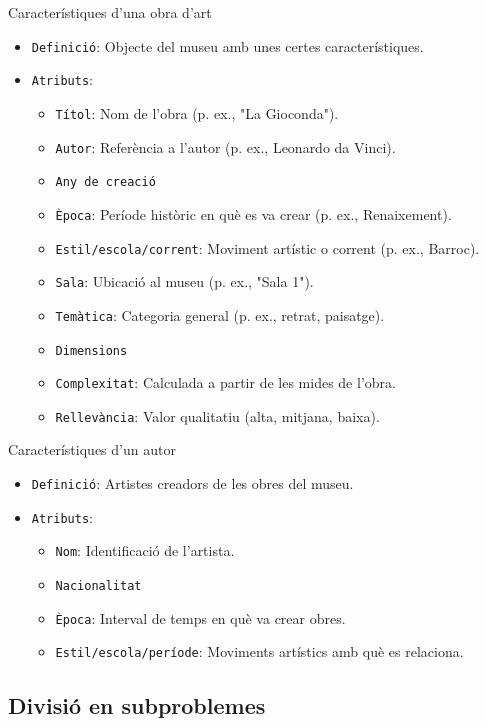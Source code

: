 \documentclass[a4paper]{article}
\begin{document}
	Característiques d'una obra d'art
	\begin{itemize}
		\item \texttt{Definició}: Objecte del museu amb unes certes característiques.
		\item \texttt{Atributs}:
			\begin{itemize}
				\item \texttt{Títol}: Nom de l’obra (p. ex., "La Gioconda").
				\item \texttt{Autor}: Referència a l’autor (p. ex., Leonardo da Vinci).
				\item \texttt{Any de creació}
				\item \texttt{Època}: Període històric en què es va crear (p. ex., Renaixement).
				\item \texttt{Estil/escola/corrent}: Moviment artístic o corrent (p. ex., Barroc).
				\item \texttt{Sala}: Ubicació al museu (p. ex., "Sala 1").
				\item \texttt{Temàtica}: Categoria general (p. ex., retrat, paisatge).
				\item \texttt{Dimensions}
				\item \texttt{Complexitat}: Calculada a partir de les mides de l'obra.
				\item \texttt{Rellevància}: Valor qualitatiu (alta, mitjana, baixa).
			\end{itemize}
	\end{itemize}
	
	Característiques d'un autor
	\begin{itemize}
		\item \texttt{Definició}: Artistes creadors de les obres del museu.
		\item \texttt{Atributs}:
		\begin{itemize}
			\item \texttt{Nom}: Identificació de l’artista.
			\item \texttt{Nacionalitat}
			\item \texttt{Època}: Interval de temps en què va crear obres.
			\item \texttt{Estil/escola/període}: Moviments artístics amb què es relaciona.
		\end{itemize}
	\end{itemize}
	
	\subsection{Divisió en subproblemes}
	
\end{document}
